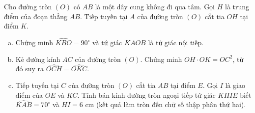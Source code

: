 \begin{bt}%
Cho đường tròn $(O)$ có $AB$ là một dây cung không đi qua tâm. Gọi $H$ là trung điểm của đoạn thẳng $AB$. Tiếp tuyến tại $A$ của đường tròn $(O)$ cắt tia $OH$ tại điểm $K$.
\begin{enumerate}[a)]
	\item Chứng minh $\widehat{KBO} = 90^\circ$ và tứ giác $KAOB$ là tứ giác nội tiếp.
	\item Kẻ đường kính $AC$ của đường tròn $(O)$. Chứng minh $OH \cdot OK = OC^2$, từ đó suy ra $\widehat{OCH} = \widehat{OKC}$.
	\item Tiếp tuyến tại $C$ của đường tròn $(O)$ cắt tia $AB$ tại điểm $E$. Gọi $I$ là giao điểm của $OE$ và $KC$. Tính bán kính đường tròn ngoại tiếp tứ giác $KHIE$ biết $\widehat{KAB} = 70^\circ$ và $HI = 6\text{ cm}$ (kết quả làm tròn đến chữ số thập phân thứ hai).
\end{enumerate}
\end{bt}

